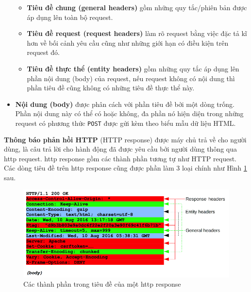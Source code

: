 \begin{itemize}
        \begin{itemize}
            \item \textbf{Tiêu đề chung (general headers)} gồm những quy tắc/phiên bản được áp dụng lên toàn bộ request.
            \item \textbf{Tiêu đề request (request headers)} làm rõ request bằng việc đặc tả kĩ hơn về bối cảnh yêu cầu cũng như những giới hạn có điều kiện trên request đó.
            \item \textbf{Tiêu đề thực thể (entity headers)} gồm những quy tắc áp dụng lên phần nội dung (body) của request, nếu request không có nội dung thì phần tiêu đề cũng không có những tiêu đề thực thể này.
        \end{itemize}
    \item \textbf{Nội dung (body)} được phân cách với phần tiêu đề bởi một dòng trống. Phần nội dung này có thể có hoặc không, đa phần nó hiện diện trong những request có phương thức \texttt{POST} được gửi kèm theo biểu mẫu dữ liệu HTML.
\end{itemize}
\textbf{Thông báo phản hồi HTTP} (HTTP response) được máy chủ trả về  cho người dùng, là câu trả lời cho hành động đã được yêu cầu bởi người dùng thông qua \acrshort{http} request. \acrshort{http} response gồm các thành phần tương tự như HTTP request. Các dòng tiêu đề trên \acrshort{http} response cũng được phần làm 3 loại chính như Hình \ref{fig:HTTP-response-headers} sau.
\begin{figure}[H]
          \centering
            \includegraphics[width=\textwidth,keepaspectratio=true]{images/HTTP-response-headers.png}
          \caption[Các thành phần trong tiêu đề của một \acrshort{http} response]{Các thành phần trong tiêu đề của một \acrshort{http} response \protect\parencite{mdn-HTTP-message}}
          \label{fig:HTTP-response-headers}
        \end{figure}


